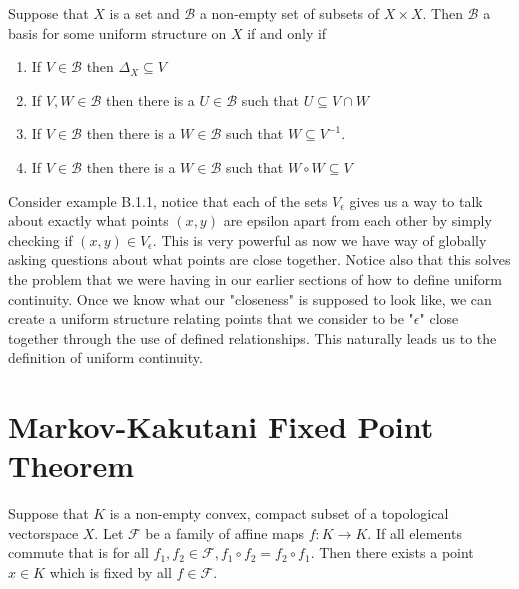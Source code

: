 \begin{defn}
  Suppose that $X$ is a set and $\mathcal{B}$ a non-empty set of subsets of $X
  \times X$. Then $\mathcal{B}$ a basis for some uniform structure on $X$ if
  and only if
  \begin{enumerate}
    \item If $V \in \mathcal{B}$ then $\Delta_{X} \subseteq V$ 
    \item If $V, W \in \mathcal{B}$ then there is a $U \in \mathcal{B}$ such
      that $U \subseteq V \cap W$
    \item If $V \in \mathcal{B}$ then there is a $W \in \mathcal{B}$ such that
      $W \subseteq V^{-1}$.
    \item If $V \in \mathcal{B}$ then there is a $W \in \mathcal{B}$ such that
      $W \circ W \subseteq V$
  \end{enumerate}
\end{defn}
Consider example B.1.1, notice that each of the sets $V_{\epsilon}$ gives us a way 
to talk about exactly what points $(x,y)$ are epsilon apart from each other by 
simply checking if $(x, y) \in V_{\epsilon}$. This is very powerful as now we have  
way of globally asking questions about what points are close together. Notice 
also that this solves the problem that we were having in our earlier sections of 
how to define uniform continuity. Once we know what our "closeness" is supposed 
to look like, we can create a uniform structure relating points that we consider 
to be "$\epsilon$" close together through the use of defined relationships. This 
naturally leads us to the definition of uniform continuity.

\newpage

\section{Markov-Kakutani Fixed Point Theorem}%
\label{sec:Markov-Kakutani Fixed Point Theorem}

\begin{thm}
  Suppose that $K$ is a non-empty convex, compact subset of a topological
  vectorspace $X$. Let $\mathcal{F}$ be a family of affine maps $f: K \to K$.
  If all elements commute that is for all $f_1, f_2 \in \mathcal{F}, f_1 \circ
  f_2 = f_2 \circ f_1$. Then there exists a point $x \in K$ which is fixed by
  all $f \in \mathcal{F}$.
\end{thm}

